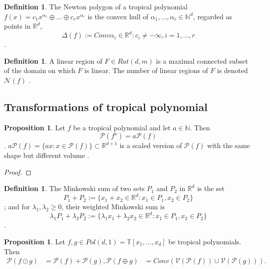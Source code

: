 \documentclass{article}
\theoremstyle{definition}
\newtheorem{definition}[theorem]{Definition}
\newtheorem{proposition}[theorem]{Proposition}
\begin{document}
\begin{definition}
The Newton polygon of a tropical polynomial $f(x) = c_1 x^{\alpha_1} \oplus \dots \oplus c_r x^{\alpha_r}$  is the convex hull of $\alpha_1 , \dots , \alpha_r \in \mathbb{N}^{d}$, regarded as points in $\mathbb{R}^{d}$,
$$ \Delta(f) := Conv{\alpha_i \in \mathbb{R}^{d} : c_i \neq -\infty , i = 1, \dots ,r } $$ \cite[p.~3]{zhang2018tropical}.
\end{definition}

\begin{definition}
A linear region of $F \in Rat(d, m)$ is a maximal connected subset of the domain on which $F$ is linear. The number of linear regions of $F$ is denoted $\mathcal{N}(f)$ \cite[p.~4]{zhang2018tropical}.
\end{definition}

\subsection{Transformations of tropical polynomial}

\begin{proposition}
Let $f$ be a tropical polynomial and let $a \in \mathbb{N}$. Then
$$ \mathcal{P}(f^{a}) = a \mathcal{P}(f) $$.
$a \mathcal{P}(f) = \{ax : x \in \mathcal{P}(f) \} \subset \mathbb{R}^{d + 1}$ is a scaled version of $\mathcal{P}(f)$ with the same shape but different volume \cite[p.~4]{zhang2018tropical}.
\end{proposition}
\begin{proof}
\end{proof}

\begin{definition}
The Minkowski sum of two sets $P_1$ and $P_2$ in $\mathbb{R}^{d}$ is the set
$$ P_1 + P_2 := \{x_1 + x_2 \in \mathbb{R}^{d} : x_1 \in P_1 ,x_2 \in P_2 \} $$;
and for $\lambda_1 , \lambda_2 \geq 0$, their weighted Minkowski sum is
$$ \lambda_1 P_1 + \lambda_2 P_2 := \{ \lambda_1 x_1 + \lambda_2 x_2 \in \mathbb{R}^{d} : x_1 \in P_1 , x_2 \in P_2 \} $$ \cite[p.~4]{zhang2018tropical}.
\end{definition}

\begin{proposition} \cite[p.~4]{zhang2018tropical}
Let $f, g \in Pol(d, 1) = \mathbb{T}[x_1, \dots , x_d]$ be tropical polynomials. Then
\begin{align*}
\mathcal{P}(f \odot g) &= \mathcal{P}(f) + \mathcal{P}(g),
\mathcal{P}(f \oplus g) &= Conv(\mathcal{V}(\mathcal{P}(f)) \cup \mathcal{V}( \mathcal{P}(g))).
\end{align*}
\end{proposition}
\end{document}
